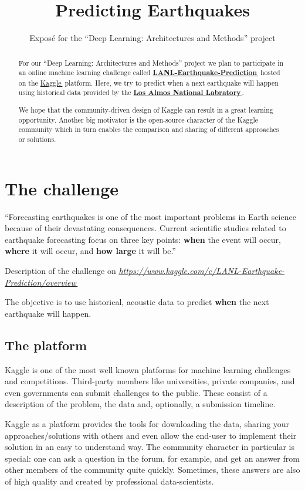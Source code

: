 \documentclass[colorback,accentcolor=tud9c,12pt]{tudreport}
\title{Predicting Earthquakes}
\subtitle{Expos\'{e} for the ``Deep Learning: Architectures and Methods'' project}
\let\orighref\href
\renewcommand{\href}[2]{\orighref{#1}{#2\,\faExternalLink}}
\begin{document}
\maketitle
\begin{abstract}
	For our ``Deep Learning: Architectures and Methods'' project we plan to participate in an online machine learning challenge called
	\textbf{\href{https://www.kaggle.com/c/LANL-Earthquake-Prediction/overview}{LANL-Earthquake-Prediction}} hosted on the \href{https://www.kaggle.com}{Kaggle} platform.
	Here, we try to predict when a next earthquake will happen using historical data provided by the \textbf{\href{https://www.lanl.gov/}{Los Almos National Labratory}}.

	We hope that the community-driven design of Kaggle can result in a great learning opportunity.
	Another big motivator is the open-source character of the Kaggle community which in turn enables the comparison and sharing of different approaches or solutions.
\end{abstract}

\chapter{The challenge}

\epigraph{``Forecasting earthquakes is one of the most important problems in Earth science because of their devastating consequences. Current scientific studies related to earthquake forecasting focus on three key points: \textbf{when} the event will occur, \textbf{where} it will occur, and \textbf{how large} it will be.''}{Description of the challenge on \textit{\href{https://www.kaggle.com/c/LANL-Earthquake-Prediction/overview}{https://www.kaggle.com/c/LANL-Earthquake-Prediction/overview}}}

The objective is to use historical, acoustic data to predict \textbf{when} the next earthquake will happen.


\section{The platform}
Kaggle is one of the most well known platforms for machine learning challenges and competitions.
Third-party members like universities, private companies, and even governments can submit challenges to the public. These consist of a description of the problem, the data and, optionally, a submission timeline.

Kaggle as a platform provides the tools for downloading the data, sharing your approaches/solutions with others and even allow the end-user to implement their solution in an easy to understand way.
The community character in particular is special: one can ask a question in the forum, for example, and get an answer from other members of the community quite quickly. Sometimes, these answers are also of high quality and created by professional data-scientists.
\end{document}
